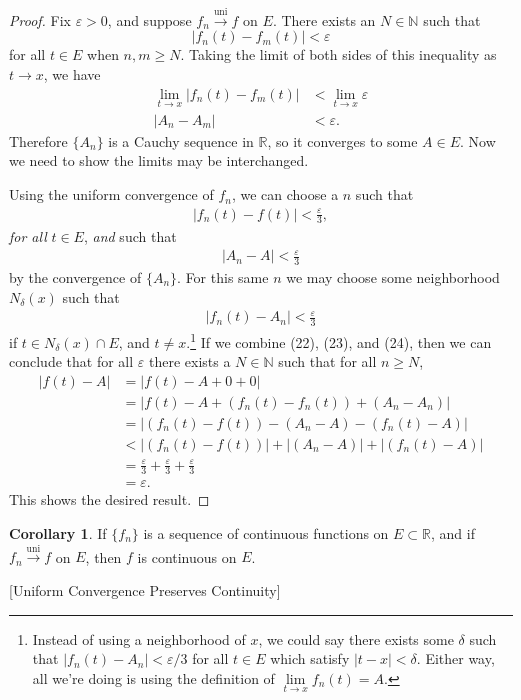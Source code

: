 \documentclass{article}
\newcommand{\N}{\mathbb{N}}
\newcommand{\R}{\mathbb{R}}
\newcommand{\uni}{\overset{\text{uni}}{\to}}
\theoremstyle{definition}
\newtheorem{corollary}{Corollary}[section]
\begin{document}
	\begin{proof}
		Fix $ \varepsilon>0 $, and suppose $ f_n\uni f $ on $ E $. There exists an $ N\in\N $ such that $$ |f_n(t)-f_m(t)|<\varepsilon$$ for all $ t\in E $ when $ n,m\ge N $. Taking the limit of both sides of this inequality as $ t\to x $, we have \begin{align*}
			\lim\limits_{t\to x}|f_n(t)-f_m(t)|&<\lim\limits_{t\to x}\varepsilon\\|A_n-A_m|&<\varepsilon.
		\end{align*}
		Therefore $ \{A_n\} $ is a Cauchy sequence in $ \R $, so it converges to some $ A\in E $. Now we need to show the limits may be interchanged.
		
		Using the uniform convergence of $ f_n $, we can choose a $ n $ such that \begin{align}
			|f_n(t)-f(t)|<\frac{\varepsilon}{3},
		\end{align}
		\textit{for all} $ t\in E $, \textit{and} such that \begin{align}
			|A_n-A|<\frac{\varepsilon}{3}
		\end{align}by the convergence of $ \{A_n\} $. For this same $ n $ we may choose some neighborhood $ N_\delta(x) $ such that\begin{align}
			|f_n(t)-A_n|<\frac{\varepsilon}{3}
		\end{align}  if $ t\in N_\delta(x)\cap E $, and $ t\neq x $.\footnote{Instead of using a neighborhood of $ x $, we could say there exists some $ \delta $ such that $ |f_n(t)-A_n|<\varepsilon/3 $ for all $ t\in E $ which satisfy $ |t-x|<\delta $. Either way, all we're doing is using the definition of $ \lim\limits_{t\to x}f_n(t)=A $. } If we combine (22), (23), and (24), then we can conclude that for all $ \varepsilon $ there exists a $ N\in\N $ such that for all $ n\ge N $, \begin{align*}
			|f(t)-A|&=|f(t)-A+0+0|\\&=|f(t)-A+(f_n(t)-f_n(t))+(A_n-A_n)|\\&=|(f_n(t)-f(t))-(A_n-A)-(f_n(t)-A)|\\&<|(f_n(t)-f(t))|+|(A_n-A)|+|(f_n(t)-A)| \\&=\frac{\varepsilon}{3}+\frac{\varepsilon}{3}+\frac{\varepsilon}{3}\\&=\varepsilon.
		\end{align*}
		This shows the desired result.
	\end{proof}
	\begin{corollary}
		If $ \{f_n\} $ is a sequence of continuous functions on $ E\subset \R $, and if $ f_n\uni f $ on $ E $, then $ f $ is continuous on $ E $.
	\end{corollary}[Uniform Convergence Preserves Continuity]
\end{document}
